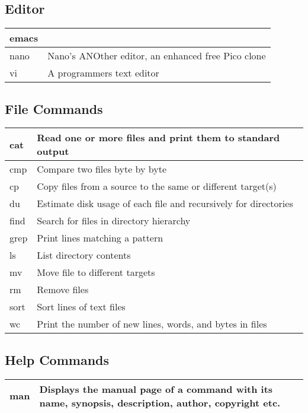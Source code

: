 \subsection{Editor}

\begin{tabular}{|p{}|p{}|} \hline
emacs  & \\ \hline
nano   & Nano's ANOther editor, an enhanced free Pico clone \\ \hline
vi     & A programmers text editor \\ \hline
\end{tabular}

\subsection{File Commands}

\begin{tabular}{|p{}|p{}|} \hline
cat   & Read one or more files and print them to standard output \\ \hline
cmp   & Compare two files byte by byte \\ \hline
cp    & Copy files from a source to the same or different target(s) \\ \hline
du    & Estimate disk usage of each file and recursively for directories \\ \hline
find  & Search for files in directory hierarchy \\ \hline
grep  & Print lines matching a pattern \\ \hline
ls    & List directory contents \\ \hline
mv    & Move file to different targets \\ \hline
rm    & Remove files \\ \hline
sort  & Sort lines of text files \\ \hline
wc    & Print the number of new lines, words, and bytes in files \\ \hline
\end{tabular}


\subsection{Help Commands}

\begin{tabular}{|p{}|p{}|} \hline
man   & Displays the manual page of a command with its name, synopsis, description, author, copyright etc. \\ \hline
\end{tabular}

